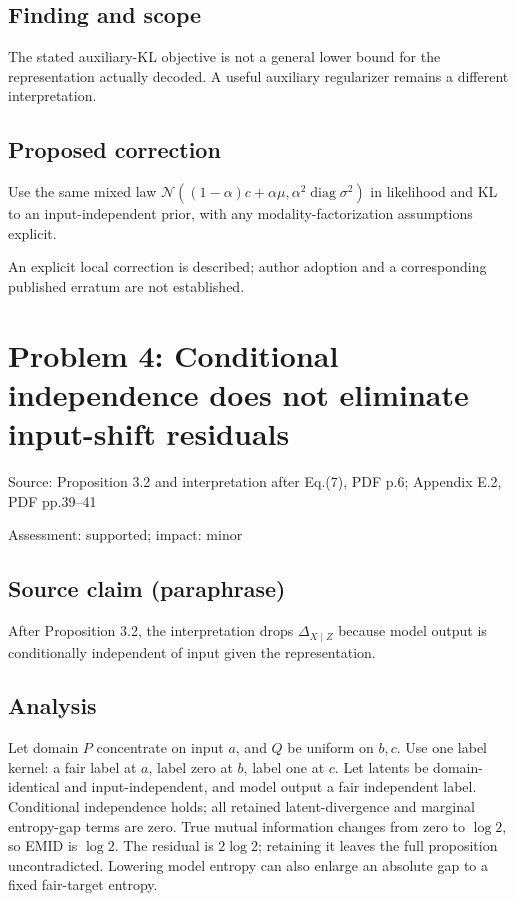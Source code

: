 \documentclass[11pt]{article}
\begin{document}
\subsection*{Finding and scope}

The stated auxiliary-KL objective is not a general lower bound for the representation actually decoded. A useful auxiliary regularizer remains a different interpretation.

\subsection*{Proposed correction}

Use the same mixed law \(\mathcal N((1-\alpha)c+\alpha\mu,\alpha^2\operatorname{diag}\sigma^2)\) in likelihood and KL to an input-independent prior, with any modality-factorization assumptions explicit.

An explicit local correction is described; author adoption and a corresponding published erratum are not established.

\section*{Problem 4: Conditional independence does not eliminate input-shift residuals}

Source: Proposition 3.2 and interpretation after Eq.(7), PDF p.6; Appendix E.2, PDF pp.39–41

Assessment: supported; impact: minor

\subsection*{Source claim (paraphrase)}

After Proposition 3.2, the interpretation drops \(\Delta_{X\mid Z}\) because model output is conditionally independent of input given the representation.

\subsection*{Analysis}

Let domain \(P\) concentrate on input \(a\), and \(Q\) be uniform on \(b,c\). Use one label kernel: a fair label at \(a\), label zero at \(b\), label one at \(c\). Let latents be domain-identical and input-independent, and model output a fair independent label. Conditional independence holds; all retained latent-divergence and marginal entropy-gap terms are zero. True mutual information changes from zero to \(\log2\), so EMID is \(\log2\). The residual is \(2\log2\); retaining it leaves the full proposition uncontradicted. Lowering model entropy can also enlarge an absolute gap to a fixed fair-target entropy.
\end{document}
